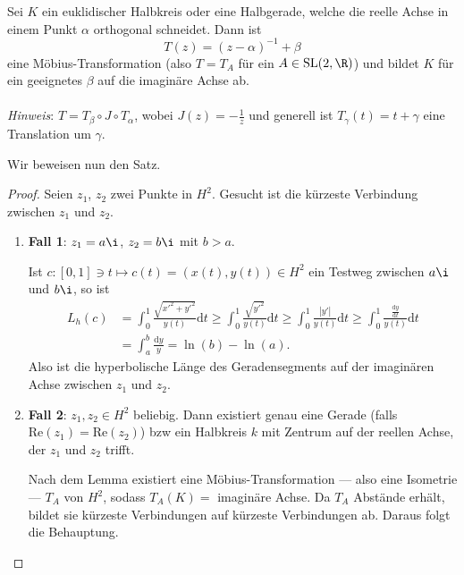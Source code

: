 \begin{lemma}
  Sei \( K \) ein euklidischer Halbkreis oder eine Halbgerade, welche die reelle Achse in einem Punkt \( \alpha \) orthogonal schneidet. Dann ist
  \begin{equation*}
    T(z) = (z - \alpha)^{-1} + \beta
  \end{equation*}
  eine Möbius-Transformation (also \( T = T_A \) für ein \( A \in \text{SL}(2,\R) \)) und bildet \( K \) für ein geeignetes \( \beta \) auf die imaginäre Achse ab. \\
  \ \\
  \emph{Hinweis}: \( T = T_\beta \circ J \circ T_\alpha \), wobei \( J(z) = -\frac{1}{z} \) und generell ist \( T_\gamma(t) = t + \gamma \) eine Translation um \( \gamma \).
\end{lemma}

Wir beweisen nun den Satz.

\begin{proof}
  Seien \( z_1 \), \( z_2 \) zwei Punkte in \( H^2 \). Gesucht ist die kürzeste Verbindung zwischen \( z_1 \) und \( z_2 \).
  \begin{enumerate}
    \item \textbf{Fall 1}: \( z_1 = a\i \), \( z_2 = b\i \) mit \( b > a \).

    Ist \( c : [0,1] \ni t \mapsto c(t) = (x(t), y(t)) \in H^2 \) ein Testweg zwischen \( a\i \) und \( b\i \), so ist
    \begin{align*}
      L_h(c) &= \int_0^1 \frac{\sqrt{x'^2 + y'^2}}{y(t)}\text{d}t \geq \int_0^1 \frac{\sqrt{y'^2}}{y(t)}\text{d}t \geq \int_0^1 \frac{\left\vert y' \right\vert}{y(t)}\text{d}t \geq \int_0^1 \frac{\frac{\text{d}y}{\text{d}t}}{y(t)}\text{d}t \\
       &= \int_a^b \frac{\text{d}y}{y} = \ln(b) - \ln(a)\text{.}
    \end{align*}
    Also ist die hyperbolische Länge des Geradensegments auf der imaginären Achse zwischen \( z_1 \) und \( z_2 \).

    \item \textbf{Fall 2}: \( z_1, z_2 \in H^2 \) beliebig. Dann existiert genau eine Gerade (falls \( \text{Re}(z_1) = \text{Re}(z_2) \)) bzw ein Halbkreis \( k \) mit Zentrum auf der reellen Achse, der \( z_1 \) und \( z_2 \) trifft.

    Nach dem Lemma existiert eine Möbius-Transformation --- also eine Isometrie --- \( T_A \) von \( H^2 \), sodass \( T_A(K) = \) imaginäre Achse. Da \( T_A \) Abstände erhält, bildet sie kürzeste Verbindungen auf kürzeste Verbindungen ab. Daraus folgt die Behauptung.
  \end{enumerate}
\end{proof}


